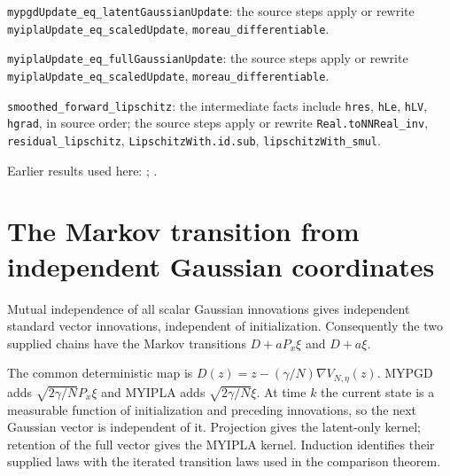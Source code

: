 \documentclass[11pt,a4paper]{article}
\begin{document}
\begin{leanbox}
\texttt{mypgd\allowbreak{}Update\_\allowbreak{}eq\_\allowbreak{}latent\allowbreak{}Gaussian\allowbreak{}Update}: the source steps apply or rewrite \texttt{myipla\allowbreak{}Update\_\allowbreak{}eq\_\allowbreak{}scaled\allowbreak{}Update}, \texttt{moreau\_\allowbreak{}differentiable}.



\texttt{myipla\allowbreak{}Update\_\allowbreak{}eq\_\allowbreak{}full\allowbreak{}Gaussian\allowbreak{}Update}: the source steps apply or rewrite \texttt{myipla\allowbreak{}Update\_\allowbreak{}eq\_\allowbreak{}scaled\allowbreak{}Update}, \texttt{moreau\_\allowbreak{}differentiable}.



\texttt{smoothed\_\allowbreak{}forward\_\allowbreak{}lipschitz}: the intermediate facts include \texttt{hres}, \texttt{h\allowbreak{}Le}, \texttt{h\allowbreak{}LV}, \texttt{hgrad}, in source order; the source steps apply or rewrite \texttt{Real.\allowbreak{}to\allowbreak{}NNReal\_\allowbreak{}inv}, \texttt{residual\_\allowbreak{}lipschitz}, \texttt{Lipschitz\allowbreak{}With.\allowbreak{}id.\allowbreak{}sub}, \texttt{lipschitz\allowbreak{}With\_\allowbreak{}smul}.
\end{leanbox}


Earlier results used here: \cite[Section~3.1.1]{LangevinLean2026IPLA}; \cite[Section~3.1.4]{LangevinLean2026IPLA}.

\section{\texorpdfstring{The Markov transition from independent Gaussian coordinates}{The Markov transition from independent Gaussian coordinates}}


Mutual independence of all scalar Gaussian innovations gives independent standard vector innovations, independent of initialization. Consequently the two supplied chains have the Markov transitions \(D+aP_x\xi\) and \(D+a\xi\).



The common deterministic map is \(D(z)=z-(\gamma/N)\nabla V_{N,\eta}(z)\). MYPGD adds \(\sqrt{2\gamma/N}P_x\xi\) and MYIPLA adds \(\sqrt{2\gamma/N}\xi\). At time \(k\) the current state is a measurable function of initialization and preceding innovations, so the next Gaussian vector is independent of it. Projection gives the latent-only kernel; retention of the full vector gives the MYIPLA kernel. Induction identifies their supplied laws with the iterated transition laws used in the comparison theorem.
\end{document}
